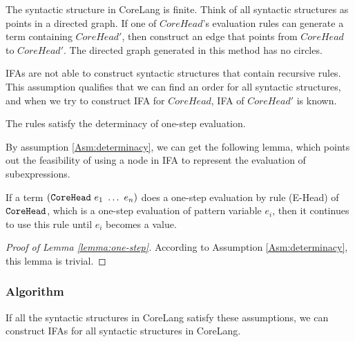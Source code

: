 \begin{Asm}
\label{Asm:orderliness}
The syntactic structure in CoreLang is finite. Think of all syntactic structures as points in a directed graph. If one of $CoreHead$'s evaluation rules can generate a term containing $CoreHead'$, then construct an edge that points from $CoreHead$ to $CoreHead'$. The directed graph generated in this method has no circles.
\end{Asm}

IFAs are not able to construct syntactic structures that contain recursive rules. This assumption qualifies that we can find an order for all syntactic structures, and when we try to construct IFA for $CoreHead$, IFA of $CoreHead'$ is known.

\begin{Asm}
\label{Asm:determinacy}
The rules satisfy the determinacy of one-step evaluation.
\end{Asm}

By assumption \ref{Asm:determinacy}, we can get the following lemma, which points out the feasibility of using a node in IFA to represent the evaluation of subexpressions.

\begin{lemma}
\label{lemma:one-step}
If a term $(\mbox{\tt CoreHead}~e_1~\ldots~e_n)$ does a one-step evaluation by rule (E-Head) of $\mbox{\tt CoreHead}$, which is a one-step evaluation of pattern variable $e_i$, then it continues to use this rule until $e_i$ becomes a value.
\end{lemma}

\begin{proof}[Proof of Lemma \ref{lemma:one-step}]
According to Assumption \ref{Asm:determinacy}, this lemma is trivial.
\end{proof}

\subsubsection{Algorithm}

\begin{mythm}
\label{mythm:Rule2IFA}
If all the syntactic structures in CoreLang satisfy these assumptions, we can construct IFAs for all syntactic structures in CoreLang.
\end{mythm}

